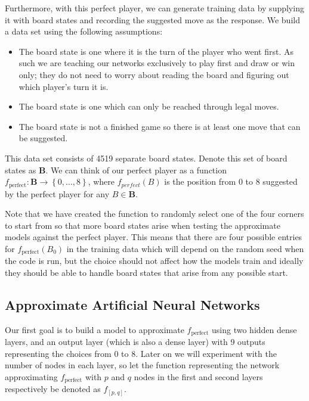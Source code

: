\documentclass{somasmsc}
\begin{document}
Furthermore, with this perfect player, we can generate training data by supplying it with board states and recording the suggested move as the response. We build a data set using the following assumptions:
\begin{itemize}
    \item The board state is one where it is the turn of the player who went first. As such we are teaching our networks exclusively to play first and draw or win only; they do not need to worry about reading the board and figuring out which player's turn it is.
    \item The board state is one which can only be reached through legal moves.
    \item The board state is not a finished game so there is at least one move that can be suggested.
\end{itemize}

This data set consists of 4519 separate board states. Denote this set of board states as $\mathbf{B}$. We can think of our perfect player as a function $f_{\text{perfect}} : \mathbf{B} \rightarrow \left\{0, \dots, 8\right\}$, where $f_{perfect}\left(B\right)$ is the position from 0 to 8 suggested by the perfect player for any $B \in \mathbf{B}$.

Note that we have created the function to randomly select one of the four corners to start from so that more board states arise when testing the approximate models against the perfect player. This means that there are four possible entries for $f_{\text{perfect}}\left(B_0\right)$ in the training data which will depend on the random seed when the code is run, but the choice should not affect how the models train and ideally they should be able to handle board states that arise from any possible start.

\subsection{Approximate Artificial Neural Networks}

Our first goal is to build a model to approximate $f_{\text{perfect}}$ using two hidden dense layers, and an output layer (which is also a dense layer) with 9 outputs representing the choices from 0 to 8. Later on we will experiment with the number of nodes in each layer, so let the function representing the network approximating $f_{\text{perfect}}$ with $p$ and $q$ nodes in the first and second layers respectively be denoted as $f_{\left[p,q\right]}$.
\end{document}
